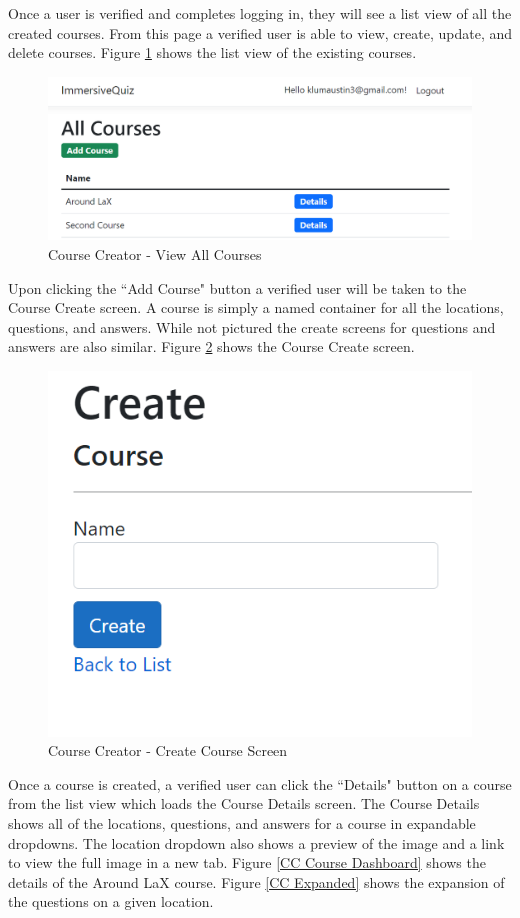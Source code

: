 Once a user is verified and completes logging in, they will see a list view of all the created courses. From this page a verified user is able to view, create, update, and delete courses. Figure \ref{CC All Courses} shows the list view of the existing courses. 
 \begin{figure}[htb]
 	\centering
 	\includegraphics[width=.6\textwidth]{Requirements/assets/cc-all-courses.png}
 	\caption[Course Creator - Veiw All Courses]{\label{CC All Courses}Course Creator - View All Courses}
 \end{figure}
Upon clicking the ``Add Course" button a verified user will be taken to the Course Create screen. A course is simply a named container for all the locations, questions, and answers. While not pictured the create screens for questions and answers are also similar. Figure \ref{CC Create Course} shows the Course Create screen.
\begin{figure}[htb]
	\centering
	\includegraphics[width=.6\textwidth]{Requirements/assets/cc-create-course.png}
	\caption[Course Creator - Create Course Screen]{\label{CC Create Course}Course Creator - Create Course Screen}
\end{figure}
Once a course is created, a verified user can click the ``Details" button on a course from the list view which loads the Course Details screen. The Course Details shows all of the locations, questions, and answers for a course in expandable dropdowns. The location dropdown also shows a preview of the image and a link to view the full image in a new tab. Figure \ref{CC Course Dashboard} shows the details of the Around LaX course. Figure \ref{CC Expanded} shows the expansion of the questions on a given location. 
